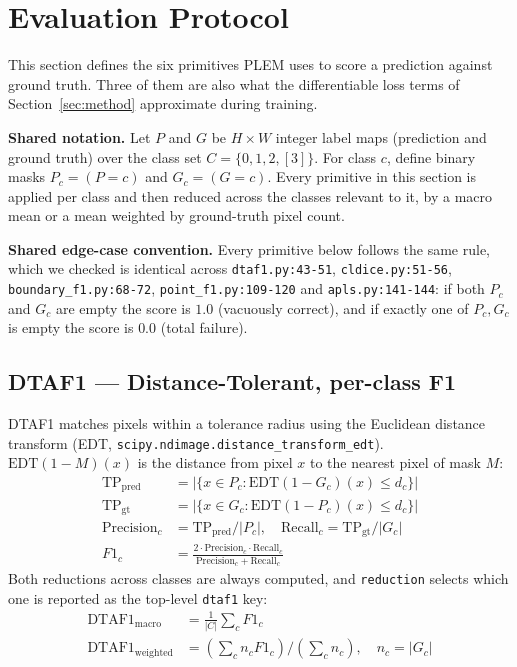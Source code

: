 \section{Evaluation Protocol}
\label{sec:evalprotocol}

This section defines the six primitives PLEM uses to score a prediction against ground truth.
Three of them are also what the differentiable loss terms of Section~\ref{sec:method} approximate
during training.

\textbf{Shared notation.} Let $P$ and $G$ be $H\times W$ integer label maps (prediction and
ground truth) over the class set $C = \{0, 1, 2, [3]\}$. For class $c$, define binary masks
$P_c = (P = c)$ and $G_c = (G = c)$. Every primitive in this section is applied per class and then
reduced across the classes relevant to it, by a macro mean or a mean weighted by ground-truth
pixel count.

\textbf{Shared edge-case convention.} Every primitive below follows the same rule, which we
checked is identical across \texttt{dtaf1.py:43-51}, \texttt{cldice.py:51-56},
\texttt{boundary\_f1.py:68-72}, \texttt{point\_f1.py:109-120} and \texttt{apls.py:141-144}: if
both $P_c$ and $G_c$ are empty the score is $1.0$ (vacuously correct), and if exactly one of
$P_c, G_c$ is empty the score is $0.0$ (total failure).

\subsection{DTAF1 --- Distance-Tolerant, per-class F1}
\label{subsec:dtaf1}

DTAF1 matches pixels within a tolerance radius using the Euclidean distance transform (EDT,
\texttt{scipy.ndimage.distance\_transform\_edt}). $\mathrm{EDT}(1-M)(x)$ is the distance from pixel
$x$ to the nearest pixel of mask $M$:
\begin{align}
  \mathrm{TP}_{\mathrm{pred}} &= |\{x \in P_c : \mathrm{EDT}(1-G_c)(x) \le d_c\}| \\
  \mathrm{TP}_{\mathrm{gt}}   &= |\{x \in G_c : \mathrm{EDT}(1-P_c)(x) \le d_c\}| \\
  \mathrm{Precision}_c &= \mathrm{TP}_{\mathrm{pred}} / |P_c|, \quad
  \mathrm{Recall}_c = \mathrm{TP}_{\mathrm{gt}} / |G_c| \\
  F1_c &= \frac{2 \cdot \mathrm{Precision}_c \cdot \mathrm{Recall}_c}
               {\mathrm{Precision}_c + \mathrm{Recall}_c}
\end{align}
Both reductions across classes are always computed, and \texttt{reduction} selects which one is
reported as the top-level \texttt{dtaf1} key:
\begin{align}
  \mathrm{DTAF1}_{\mathrm{macro}} &= \tfrac{1}{|C|}\textstyle\sum_c F1_c \\
  \mathrm{DTAF1}_{\mathrm{weighted}} &= \left(\textstyle\sum_c n_c F1_c\right) \big/
    \left(\textstyle\sum_c n_c\right), \quad n_c = |G_c|
\end{align}

